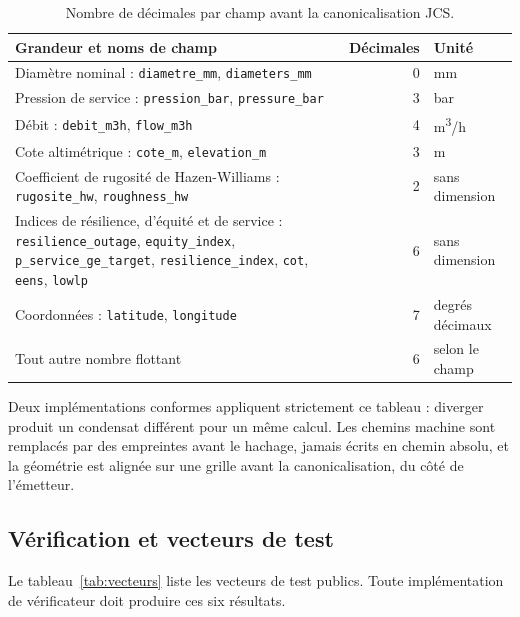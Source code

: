 \documentclass[11pt,a4paper]{article}
\begin{document}
\begin{table}[H]\centering\small
\caption{Nombre de décimales par champ avant la canonicalisation JCS.}\label{tab:precision}
\begin{tabularx}{\linewidth}{@{}Xrl@{}}
\toprule
\textbf{Grandeur et noms de champ} & \textbf{Décimales} & \textbf{Unité} \\
\midrule
Diamètre nominal : \texttt{diametre\_mm}, \texttt{diameters\_mm} & 0 & mm \\
Pression de service : \texttt{pression\_bar}, \texttt{pressure\_bar} & 3 & bar \\
Débit : \texttt{debit\_m3h}, \texttt{flow\_m3h} & 4 & m\textsuperscript{3}/h \\
Cote altimétrique : \texttt{cote\_m}, \texttt{elevation\_m} & 3 & m \\
Coefficient de rugosité de Hazen-Williams : \texttt{rugosite\_hw}, \texttt{roughness\_hw} & 2 & sans dimension \\
Indices de résilience, d'équité et de service : \texttt{resilience\_outage}, \texttt{equity\_index}, \texttt{p\_service\_ge\_target}, \texttt{resilience\_index}, \texttt{cot}, \texttt{eens}, \texttt{lowlp} & 6 & sans dimension \\
Coordonnées : \texttt{latitude}, \texttt{longitude} & 7 & degrés décimaux \\
Tout autre nombre flottant & 6 & selon le champ \\
\bottomrule
\end{tabularx}
\end{table}

Deux implémentations conformes appliquent strictement ce tableau : diverger produit un condensat différent pour un même calcul. Les chemins machine sont remplacés par des empreintes avant le hachage, jamais écrits en chemin absolu, et la géométrie est alignée sur une grille avant la canonicalisation, du côté de l'émetteur.

\subsection{Vérification et vecteurs de test}

Le tableau~\ref{tab:vecteurs} liste les vecteurs de test publics. Toute implémentation de vérificateur doit produire ces six résultats.
\end{document}
